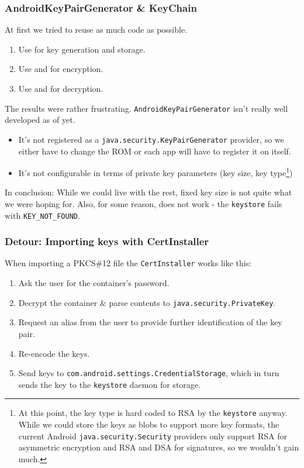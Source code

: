 \documentclass[a4paper,draft]{scrartcl}
\begin{document}
		\subsubsection{AndroidKeyPairGenerator \& KeyChain}
			At first we tried to reuse as much code as possible.		
			\begin{enumerate}
				\item Use  for key generation and storage.
				\item Use  and  for encryption.
				\item Use  and  for decryption.
			\end{enumerate}
			The results were rather frustrating. \texttt{AndroidKeyPairGenerator} isn't really well developed as of yet.
			\begin{itemize}
				\item It's not registered as a \texttt{java.security.KeyPairGenerator} provider, so we either have to change the ROM or each app will have to register it on itself.
				\item It's not configurable in terms of private key parameters (key size, key type\footnote{At this point, the key type is hard coded to RSA by the \texttt{keystore} anyway. While we could store the keys as blobs to support more key formats, the current Android \texttt{java.security.Security} providers only support RSA for asymmetric encryption and RSA and DSA for signatures, so we wouldn't gain much.})
			\end{itemize}
			In conclusion: While we could live with the rest, fixed key size is not quite what we were hoping for. Also, for some reason,  does not work - the \texttt{keystore} fails with \texttt{KEY\_NOT\_FOUND}.

		\subsubsection*{Detour: Importing keys with CertInstaller}
			When importing a PKCS\#12 file the \texttt{CertInstaller} works like this:%
			\begin{enumerate}
				\item Ask the user for the container's password.
				\item Decrypt the container \& parse contents to \texttt{java.security.PrivateKey}.
				\item Request an alias from the user to provide further identification of the key pair.
				\item Re-encode the keys.
				\item Send keys to \texttt{com.android.settings.CredentialStorage}, which in turn sends the key to the \texttt{keystore} daemon for storage.
			\end{enumerate}
\end{document}
